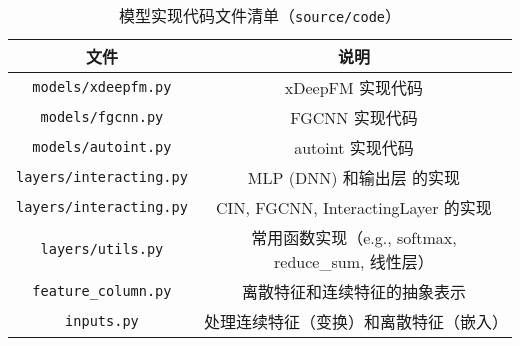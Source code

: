 \documentclass[degree=project,degree-type=project,cjk-font=noto]{thuthesis}
\begin{document}
\begin{table}[htb]
  \centering
  \caption{模型实现代码文件清单（\texttt{source/code}）}
  \label{tab:files}
  \begin{tabular}{cc}
    \toprule
    \textbf{文件}         & \textbf{说明}  \\
    \midrule
    \texttt{models/xdeepfm.py} & xDeepFM 实现代码 \\
    \texttt{models/fgcnn.py} & FGCNN 实现代码 \\
    \texttt{models/autoint.py} & autoint 实现代码 \\
    \texttt{layers/interacting.py}           & MLP (DNN) 和输出层 的实现 \\
    \texttt{layers/interacting.py}           & CIN, FGCNN, InteractingLayer 的实现 \\
    \texttt{layers/utils.py}        & 常用函数实现（e.g., softmax, reduce\_sum, 线性层） \\
    \texttt{feature\_column.py} & 离散特征和连续特征的抽象表示 \\
    \texttt{inputs.py} & 处理连续特征（变换）和离散特征（嵌入）\\
    \bottomrule
  \end{tabular}
\end{table}
\end{document}
